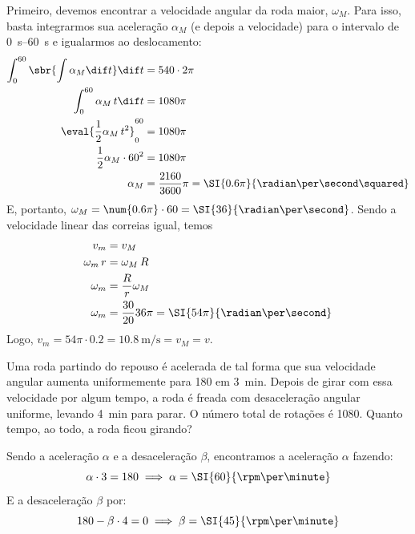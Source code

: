 \documentclass[]{IMTexam}
\begin{document}
\begin{questions}
\begin{solution}
		Primeiro, devemos encontrar a velocidade angular da roda maior, $ \omega_M $. Para isso, basta integrarmos sua aceleração $ \alpha_M $ (e depois a velocidade) para o intervalo de \SIrange{0}{60}{\second} e igualarmos ao deslocamento:
		\begin{align*}
			\int_{0}^{60}\sbr{\int\alpha_M\dif t}\dif t  & =540\cdot 2\pi                                                 \\
			\int_{0}^{60}\alpha_M\, t\dif t              & =1080\pi                                                       \\
			\eval{\dfrac{1}{2}\alpha_M \,t^{2}}_{0}^{60} & =1080\pi                                                       \\
			\dfrac{1}{2}\alpha_M \cdot 60^{2}            & =1080\pi                                                       \\
			\alpha_M                                     & =\dfrac{2160}{3600}\pi=\SI{0.6\pi}{\radian\per\second\squared}
		\end{align*}
		E, portanto, $ \omega_M=\num{0.6\pi}\cdot60=\SI{36}{\radian\per\second} $. Sendo a velocidade linear das correias igual, temos
		\begin{align*}
			v_m         & =v_M                                                \\
			\omega_m\,r & = \omega_M\,R                                       \\
			\omega_m    & =\dfrac{R}{r}\omega_M                               \\
			\omega_m    & =\dfrac{30}{20}36\pi=\SI{54\pi}{\radian\per\second}
		\end{align*}
		Logo, $ v_m=54\pi\cdot\num{0.2}=\SI{10.8}{\meter\per\second}=v_M=v $.

	\end{solution}



	\question
	Uma roda partindo do repouso é acelerada de tal forma que sua velocidade angular aumenta uniformemente para \SI{180}{\rpm} em \SI{3}{\minute}. Depois de girar com essa velocidade por algum tempo, a roda é freada com desaceleração angular uniforme, levando \SI{4}{\minute} para parar. O número total de rotações é \num{1080}. Quanto tempo, ao todo, a roda ficou girando?

	\begin{solution}
		Sendo a aceleração $ \alpha $ e a desaceleração $ \beta $, encontramos a aceleração $ \alpha $ fazendo:
		\[ \alpha\cdot3=180\implies \alpha=\SI{60}{\rpm\per\minute} \]
		E a desaceleração $ \beta $ por:
		\[ 180-\beta\cdot4=0\implies \beta=\SI{45}{\rpm\per\minute} \]


\end{solution}
\end{questions}
\end{document}
